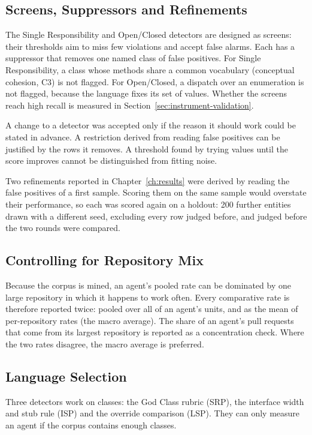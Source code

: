 \subsection{Screens, Suppressors and Refinements}

The Single Responsibility and Open/Closed detectors are designed as screens: their thresholds aim to
miss few violations and accept false alarms. Each has a suppressor that removes one named class of
false positives. For Single Responsibility, a class whose methods share a common vocabulary
(conceptual cohesion, C3) is not flagged. For Open/Closed, a dispatch over an enumeration is not
flagged, because the language fixes its set of values. Whether the screens reach high recall is
measured in Section~\ref{sec:instrument-validation}.

A change to a detector was accepted only if the reason it should work could be stated in advance.
A restriction derived from reading false positives can be justified by the rows it removes. A
threshold found by trying values until the score improves cannot be distinguished from fitting
noise.

Two refinements reported in Chapter~\ref{ch:results} were derived by reading the false positives of
a first sample. Scoring them on the same sample would overstate their performance, so each was
scored again on a holdout: 200 further entities drawn with a different seed, excluding every row
judged before, and judged before the two rounds were compared.

\subsection{Controlling for Repository Mix}
\label{sec:repo-mix}

Because the corpus is mined, an agent's pooled rate can be dominated by one large repository in which
it happens to work often. Every comparative rate is therefore reported twice: pooled over all of an
agent's units, and as the mean of per-repository rates (the macro average). The share of an agent's
pull requests that come from its largest repository is reported as a concentration check. Where the
two rates disagree, the macro average is preferred.

\subsection{Language Selection}
\label{sec:language-availability}

Three detectors work on classes: the God Class rubric (SRP), the interface width and stub rule (ISP)
and the override comparison (LSP). They can only measure an agent if the corpus contains enough
classes.

